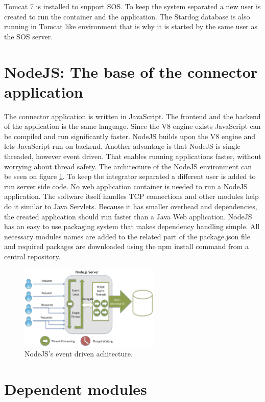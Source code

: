 Tomcat 7 is installed to support SOS. To keep the system separated a new user is created to run the container and the application. The Stardog database is also running in Tomcat like environment that is why it is started by the same user as the SOS server. 

\section{NodeJS: The base of the connector application}

The connector application is written in JavaScript. The frontend and the backend of the application is the same language. Since the V8 engine exists JavaScript can be compiled and run significantly faster\cite{v8}. NodeJS builds upon the V8 engine and lets JavaScript run on backend. Another advantage is that NodeJS is single threaded, however event driven. That enables running applications faster, without worrying about thread safety. The architecture of the NodeJS environment can be seen on figure \ref{fig:node}. To keep the integrator separated a different user is added to run server side code. No web application container is needed to run a NodeJS application. The software itself handles TCP connections and other modules help do it similar to Java Servlets. Because it has smaller overhead and dependencies, the created application should run faster than a Java Web application. NodeJS has an easy to use packaging system that makes dependency handling simple. All necessary modules names are added to the related part of the package.json file and required packages are downloaded using the npm install command from a central repository. 

\begin{figure}[h]
\centering
\includegraphics[width=0.6\textwidth]{figures/node.png}
\caption{NodeJS's event driven achitecture.\label{fig:node}}
\end{figure}

\section{Dependent modules}

